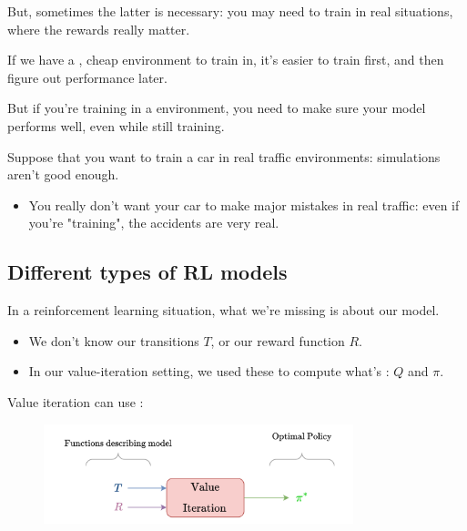         But, sometimes the latter is necessary: you may need to train in real situations, where the rewards really matter.\\

        \begin{concept}
            If we have a , cheap environment to train in, it's easier to train first, and then figure out performance later.

            But if you're training in a  environment, you need to make sure your model performs well, even while still training.
        \end{concept}

        \miniex Suppose that you want to train a car in real traffic environments: simulations aren't good enough.

        \begin{itemize}
            \item You really don't want your car to make major mistakes in real traffic: even if you're "training", the accidents are very real.
        \end{itemize}



        \phantom{}

    \subsection{Different types of RL models}

        In a reinforcement learning situation, what we're missing is  about our model. 

        \begin{itemize}
            \item We don't know our transitions $T$, or our reward function $R$.
            \item In our value-iteration setting, we used these to compute what's : $Q$ and $\pi$.
        \end{itemize}

        Value iteration can use :

        \begin{figure}[H]
            \centering
            \includegraphics[width=90mm,scale=0.5]{images/rl_images/value_iteration.png}
        \end{figure}

